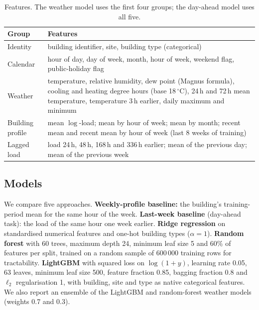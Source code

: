 \documentclass[11pt,a4paper]{article}
\begin{document}
\begin{table}[ht]
\centering
\caption{Features. The weather model uses the first four groups; the day-ahead model uses all five.}
\label{tab:features}
\small
\begin{tabularx}{\linewidth}{@{}l X@{}}
\toprule
Group & Features \\
\midrule
Identity & building identifier, site, building type (categorical) \\
Calendar & hour of day, day of week, month, hour of week, weekend flag, public-holiday flag \\
Weather & temperature, relative humidity, dew point (Magnus formula), cooling and heating degree hours
          (base 18\,$^\circ$C), 24\,h and 72\,h mean temperature, temperature 3\,h earlier, daily maximum and minimum \\
Building profile & mean $\log$-load; mean by hour of week; mean by month; recent mean and recent mean by hour
          of week (last 8 weeks of training) \\
Lagged load & load 24\,h, 48\,h, 168\,h and 336\,h earlier; mean of the previous day; mean of the previous week \\
\bottomrule
\end{tabularx}
\end{table}

\subsection{Models}
We compare five approaches.
\textbf{Weekly-profile baseline:} the building's training-period mean for the same hour of the week.
\textbf{Last-week baseline} (day-ahead task): the load of the same hour one week earlier.
\textbf{Ridge regression} on standardised numerical features and one-hot building types ($\alpha=1$).
\textbf{Random forest} \citep{breiman2001random} with 60 trees, maximum depth 24, minimum leaf size 5 and 60\% of
features per split, trained on a random sample of 600\,000 training rows for tractability.
\textbf{LightGBM} \citep{ke2017lightgbm} with squared loss on $\log(1+y)$, learning rate 0.05, 63 leaves, minimum
leaf size 500, feature fraction 0.85, bagging fraction 0.8 and $\ell_2$ regularisation 1, with building, site and
type as native categorical features. We also report an ensemble of the LightGBM and random-forest weather models
(weights 0.7 and 0.3).
\end{document}
